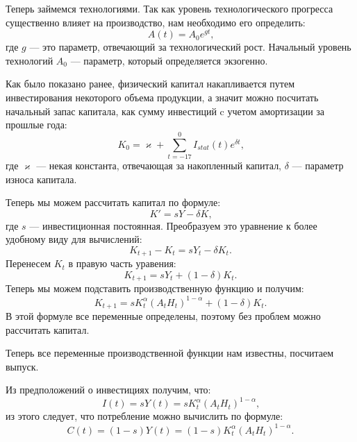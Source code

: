 Теперь займемся технологиями.
Так как уровень технологического прогресса существенно влияет на производство, нам необходимо его определить:
\begin{equation*}
A(t) = A_{0}e^{gt}\text{,}
\end{equation*}
где $g$ --- это параметр, отвечающий за технологический рост.
Начальный уровень технологий $A_0$ --- параметр, который определяется экзогенно.

Как было показано ранее, физический капитал накапливается путем инвестирования некоторого объема продукции, а значит можно посчитать начальный запас капитала, как сумму инвестиций c учетом амортизации за прошлые года:
\begin{equation*}
	K_0= \varkappa + \sum\limits_{t = -17}^{0}I_{stat}(t) e^{\delta t}\text{,}
\end{equation*}
где $\varkappa$ --- некая константа, отвечающая за накопленный капитал, $\delta$ --- параметр износа капитала.

Теперь мы можем рассчитать капитал по формуле:
\begin{equation*}
	K'=sY - \delta K \text{,}
\end{equation*}
где $s$ --- инвестиционная постоянная.
Преобразуем это уравнение к более удобному виду для вычислений:
\begin{equation*}
	K_{t+1} - K_{t} = sY_t - \delta K_{t}\text{.}
\end{equation*}
Перенесем $K_{t}$ в правую часть уравения:
\begin{equation*}
K_{t+1} = s Y_t + (1 - \delta)K_{t}\text{.}
\end{equation*}
Теперь мы можем подставить производственную функцию и получим:
\begin{equation*}
	K_{t+1} = sK_{t}^{\alpha}(A_tH_t)^{1-\alpha} + (1 - \delta)K_{t}\text{.}
\end{equation*}
В этой формуле все переменные определены, поэтому без проблем можно рассчитать капитал.

Теперь все переменные производственной функции нам известны, посчитаем выпуск.

Из предположений о инвестициях получим, что:
\begin{equation*}
	I(t)=sY(t)=sK_{t}^{\alpha}(A_tH_t)^{1-\alpha}\text{,}
\end{equation*}
из этого следует, что потребление можно вычислить по формуле:
\begin{equation*}
	C(t) = (1-s)Y(t)= (1-s)K_{t}^{\alpha}(A_tH_t)^{1-\alpha}\text{.}
\end{equation*}

